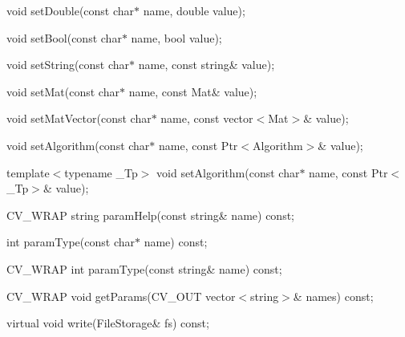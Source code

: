 {\ttfamily void set\+Double(const char$\ast$ name, double value);}

{\ttfamily }

{\ttfamily }

{\ttfamily void set\+Bool(const char$\ast$ name, bool value);}

{\ttfamily }

{\ttfamily }

{\ttfamily void set\+String(const char$\ast$ name, const string\& value);}

{\ttfamily }

{\ttfamily }

{\ttfamily void set\+Mat(const char$\ast$ name, const Mat\& value);}

{\ttfamily }

{\ttfamily }

{\ttfamily void set\+Mat\+Vector(const char$\ast$ name, const vector$<$\+Mat$>$\& value);}

{\ttfamily }

{\ttfamily }

{\ttfamily void set\+Algorithm(const char$\ast$ name, const Ptr$<$\+Algorithm$>$\& value);}

{\ttfamily }

{\ttfamily }

{\ttfamily template$<$typename \+\_\+\+Tp$>$ void set\+Algorithm(const char$\ast$ name, const Ptr$<$\+\_\+\+Tp$>$\& value);}

{\ttfamily }

{\ttfamily }

{\ttfamily C\+V\+\_\+\+W\+R\+AP string param\+Help(const string\& name) const;}

{\ttfamily }

{\ttfamily }

{\ttfamily int param\+Type(const char$\ast$ name) const;}

{\ttfamily }

{\ttfamily }

{\ttfamily C\+V\+\_\+\+W\+R\+AP int param\+Type(const string\& name) const;}

{\ttfamily }

{\ttfamily }

{\ttfamily C\+V\+\_\+\+W\+R\+AP void get\+Params(\+C\+V\+\_\+\+O\+U\+T vector$<$string$>$\& names) const;}

{\ttfamily }

{\ttfamily }

{\ttfamily virtual void write(\+File\+Storage\& fs) const;}


